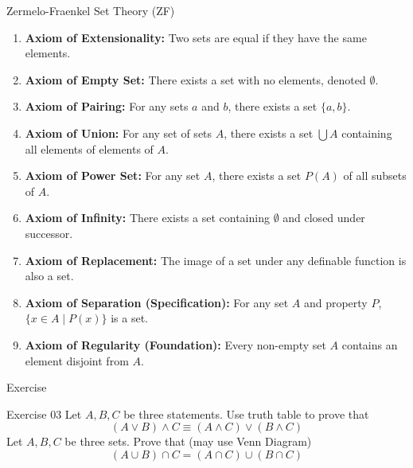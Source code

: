 \documentclass[dvipsnames]{beamer}
\theoremstyle{plain}
\theoremstyle{definition}
\begin{document}
\begin{frame}{Zermelo-Fraenkel Set Theory (ZF)}
\footnotesize
\begin{enumerate}
    \item \textbf{Axiom of Extensionality:} Two sets are equal if they have the same elements.
    \item \textbf{Axiom of Empty Set:} There exists a set with no elements, denoted $\emptyset$.
    \item \textbf{Axiom of Pairing:} For any sets $a$ and $b$, there exists a set $\{a,b\}$.
    \item \textbf{Axiom of Union:} For any set of sets $A$, there exists a set $\bigcup A$ containing all elements of elements of $A$.
    \item \textbf{Axiom of Power Set:} For any set $A$, there exists a set $P(A)$ of all subsets of $A$.
    \item \textbf{Axiom of Infinity:} There exists a set containing $\emptyset$ and closed under successor.
    \item \textbf{Axiom of Replacement:} The image of a set under any definable function is also a set.
    \item \textbf{Axiom of Separation (Specification):} For any set $A$ and property $P$, $\{x \in A \mid P(x)\}$ is a set.
    \item \textbf{Axiom of Regularity (Foundation):} Every non-empty set $A$ contains an element disjoint from $A$.
\end{enumerate}
\end{frame}

\begin{frame}{Exercise}
\begin{block}{Exercise 03}
    Let $A,B,C$ be three statements. Use truth table to prove that
    $$
    (A \lor B) \land C \equiv (A \land C) \lor (B \land C)
    $$
    Let $A,B,C$ be three sets. Prove that (may use Venn Diagram)
    $$
    (A \cup B) \cap C = (A \cap C) \cup (B \cap C)
    $$
\end{block}
\end{frame}
\end{document}
